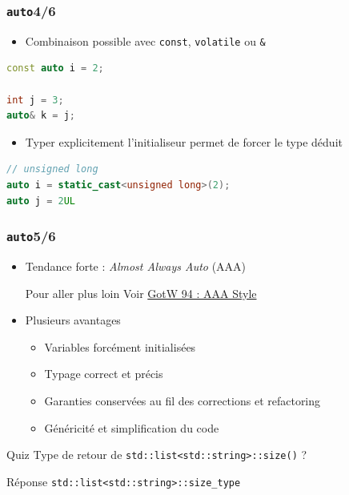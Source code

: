 \documentclass[C++.tex]{subfiles}
\begin{document}
\begin{frame}[fragile]
	\frametitle{\lstinline|auto|\titlehfill{}4/6}
	\begin{itemize}
		\item Combinaison possible avec \lstinline|const|, \lstinline|volatile| ou \lstinline|&|
	\end{itemize}

	\begin{lstlisting}[language=C++]
const auto i = 2;

int j = 3;
auto& k = j;\end{lstlisting}

	\begin{itemize}
		\item Typer explicitement l'initialiseur permet de forcer le type déduit
	\end{itemize}

	\begin{lstlisting}[language=C++]
// unsigned long
auto i = static_cast<unsigned long>(2);
auto j = 2UL\end{lstlisting}
\end{frame}

\begin{frame}[fragile]
	\frametitle{\lstinline|auto|\titlehfill{}5/6}
	\begin{itemize}
		\item Tendance forte : \textit{Almost Always Auto} (AAA)

		\begin{block}{Pour aller plus loin}
			Voir \href{https://herbsutter.com/2013/08/12/gotw-94-solution-aaa-style-almost-always-auto/}{GotW 94 : AAA Style}
		\end{block}

		\item Plusieurs avantages
		\begin{itemize}
			\item Variables forcément initialisées
			\item Typage correct et précis
			\item Garanties conservées au fil des corrections et refactoring
			\item Généricité et simplification du code
		\end{itemize}
	\end{itemize}

	\begin{block}{Quiz}
		Type de retour de \lstinline|std::list<std::string>::size()| ?
	\end{block}

	\begin{block}{Réponse}
		\lstinline|std::list<std::string>::size_type|
	\end{block}
\end{frame}
\end{document}

